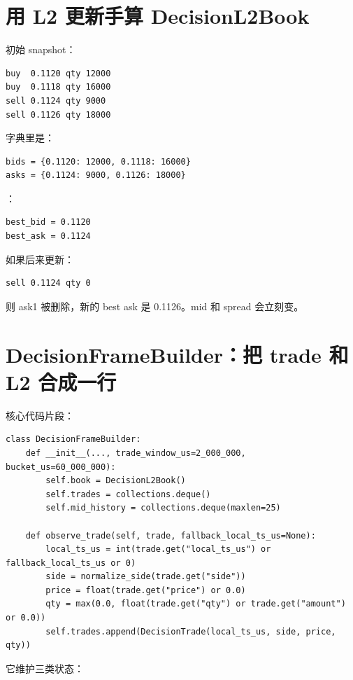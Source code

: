 \section{用 L2 更新手算 DecisionL2Book}

初始 snapshot：

\begin{lstlisting}
buy  0.1120 qty 12000
buy  0.1118 qty 16000
sell 0.1124 qty 9000
sell 0.1126 qty 18000
\end{lstlisting}

字典里是：

\begin{lstlisting}
bids = {0.1120: 12000, 0.1118: 16000}
asks = {0.1124: 9000, 0.1126: 18000}
\end{lstlisting}

：

\begin{lstlisting}
best_bid = 0.1120
best_ask = 0.1124
\end{lstlisting}

如果后来更新：

\begin{lstlisting}
sell 0.1124 qty 0
\end{lstlisting}

则 ask1 被删除，新的 best ask 是 0.1126。mid 和 spread 会立刻变。

\section{DecisionFrameBuilder：把 trade 和 L2 合成一行}

核心代码片段：

\begin{lstlisting}
class DecisionFrameBuilder:
    def __init__(..., trade_window_us=2_000_000, bucket_us=60_000_000):
        self.book = DecisionL2Book()
        self.trades = collections.deque()
        self.mid_history = collections.deque(maxlen=25)

    def observe_trade(self, trade, fallback_local_ts_us=None):
        local_ts_us = int(trade.get("local_ts_us") or fallback_local_ts_us or 0)
        side = normalize_side(trade.get("side"))
        price = float(trade.get("price") or 0.0)
        qty = max(0.0, float(trade.get("qty") or trade.get("amount") or 0.0))
        self.trades.append(DecisionTrade(local_ts_us, side, price, qty))
\end{lstlisting}

它维护三类状态：

